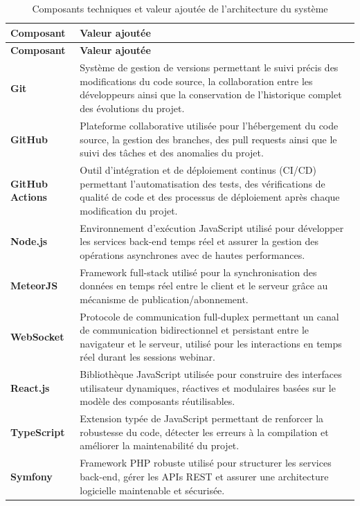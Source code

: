 \renewcommand{\arraystretch}{1.4}
\setlength{\LTleft}{0pt}
\setlength{\LTright}{0pt}
\small
\begin{longtable}{|p{3.2cm}|p{10.3cm}|}
\caption{Composants techniques et valeur ajoutée de l'architecture du système}
\label{tab:architecture-technique}\\
\hline
\textbf{Composant} & \textbf{Valeur ajoutée} \\ \hline
\endfirsthead
\hline
\textbf{Composant} & \textbf{Valeur ajoutée} \\ \hline
\endhead
\hline
\endfoot
\hline
\endlastfoot
\textbf{Git} & Système de gestion de versions permettant le suivi précis des modifications du code source, la collaboration entre les développeurs ainsi que la conservation de l'historique complet des évolutions du projet. \\ \hline
\textbf{GitHub} & Plateforme collaborative utilisée pour l'hébergement du code source, la gestion des branches, des pull requests ainsi que le suivi des tâches et des anomalies du projet. \\ \hline
\textbf{GitHub Actions} & Outil d'intégration et de déploiement continus (CI/CD) permettant l'automatisation des tests, des vérifications de qualité de code et des processus de déploiement après chaque modification du projet. \\ \hline
\textbf{Node.js} & Environnement d'exécution JavaScript utilisé pour développer les services back-end temps réel et assurer la gestion des opérations asynchrones avec de hautes performances. \\ \hline
\textbf{MeteorJS} & Framework full-stack utilisé pour la synchronisation des données en temps réel entre le client et le serveur grâce au mécanisme de publication/abonnement. \\ \hline
\textbf{WebSocket} & Protocole de communication full-duplex permettant un canal de communication bidirectionnel et persistant entre le navigateur et le serveur, utilisé pour les interactions en temps réel durant les sessions webinar. \\ \hline
\textbf{React.js} & Bibliothèque JavaScript utilisée pour construire des interfaces utilisateur dynamiques, réactives et modulaires basées sur le modèle des composants réutilisables. \\ \hline
\textbf{TypeScript} & Extension typée de JavaScript permettant de renforcer la robustesse du code, détecter les erreurs à la compilation et améliorer la maintenabilité du projet. \\ \hline
\textbf{Symfony} & Framework PHP robuste utilisé pour structurer les services back-end, gérer les APIs REST et assurer une architecture logicielle maintenable et sécurisée. \\ \hline

\end{longtable}
